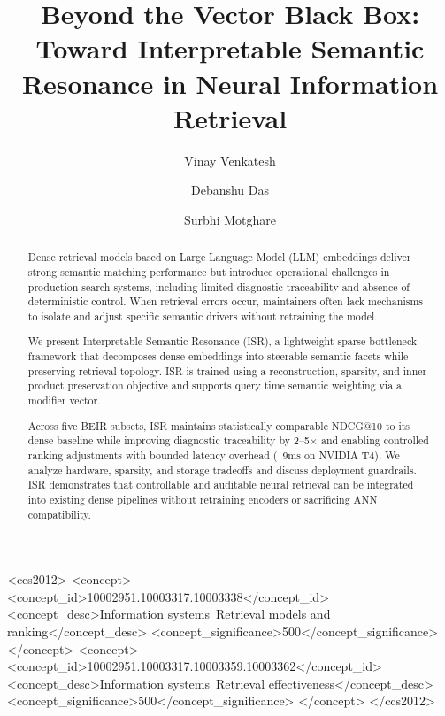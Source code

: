 \documentclass[sigconf,anonymous,screen]{acmart}
\begin{document}
\setlength{\abovedisplayskip}{3pt}
\setlength{\belowdisplayskip}{3pt}
\setlength{\abovedisplayshortskip}{1pt}
\setlength{\belowdisplayshortskip}{1pt}

\title{Beyond the Vector Black Box: Toward Interpretable Semantic Resonance in Neural Information Retrieval}

\author{Vinay Venkatesh}

\author{Debanshu Das}

\author{Surbhi Motghare}

\renewcommand{\shortauthors}{Venkatesh, Das, and Motghare}

\begin{abstract}
Dense retrieval models based on Large Language Model (LLM) embeddings deliver strong semantic matching performance but introduce operational challenges in production search systems, including limited diagnostic traceability and absence of deterministic control. When retrieval errors occur, maintainers often lack mechanisms to isolate and adjust specific semantic drivers without retraining the model.

We present Interpretable Semantic Resonance (ISR), a lightweight sparse bottleneck framework that decomposes dense embeddings into steerable semantic facets while preserving retrieval topology. ISR is trained using a reconstruction, sparsity, and inner product preservation objective and supports query time semantic weighting via a modifier vector.

Across five BEIR subsets, ISR maintains statistically comparable NDCG@10 to its dense baseline while improving diagnostic traceability by 2–5× and enabling controlled ranking adjustments with bounded latency overhead (~9ms on NVIDIA T4). We analyze hardware, sparsity, and storage tradeoffs and discuss deployment guardrails. ISR demonstrates that controllable and auditable neural retrieval can be integrated into existing dense pipelines without retraining encoders or sacrificing ANN compatibility.
\end{abstract}

\begin{CCSXML}
<ccs2012>
   <concept>
       <concept_id>10002951.10003317.10003338</concept_id>
       <concept_desc>Information systems~Retrieval models and ranking</concept_desc>
       <concept_significance>500</concept_significance>
   </concept>
   <concept>
       <concept_id>10002951.10003317.10003359.10003362</concept_id>
       <concept_desc>Information systems~Retrieval effectiveness</concept_desc>
       <concept_significance>500</concept_significance>
   </concept>
 </ccs2012>
\end{CCSXML}
\end{document}
